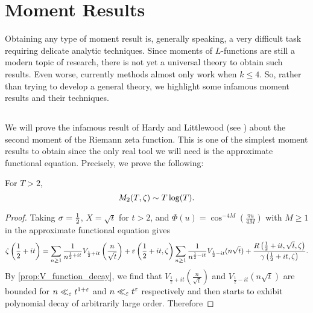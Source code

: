 \chapter{Moment Results}
  Obtaining any type of moment result is, generally speaking, a very difficult task requiring delicate analytic techniques. Since moments of $L$-functions are still a modern topic of research, there is not yet a universal theory to obtain such results. Even worse, currently methods almost only work when $k \le 4$. So, rather than trying to develop a general theory, we highlight some infamous moment results and their techniques.
  \section{}
    We will prove the infamous result of Hardy and Littlewood (see \cite{hardy1916contributions}) about the second moment of the Riemann zeta function. This is one of the simplest moment results to obtain since the only real tool we will need is the approximate functional equation. Precisely, we prove the following:

    \begin{theorem}
      For $T > 2$,
      \[
        M_{2}(T,\zeta) \sim T\log(T).
      \]
    \end{theorem}
    \begin{proof}
      Taking $\sigma = \frac{1}{2}$, $X = \sqrt{t}$ for $t > 2$, and $\Phi(u) = \cos^{-4M}\left(\frac{\pi u}{4M}\right)$ with $M \ge 1$ in the approximate functional equation gives
      \[
        \zeta\left(\frac{1}{2}+it\right) = \sum_{n \ge 1}\frac{1}{n^{\frac{1}{2}+it}}V_{\frac{1}{2}+it}\left(\frac{n}{\sqrt{t}}\right)+\varepsilon\left(\frac{1}{2}+it,\zeta\right)\sum_{n \ge 1}\frac{1}{n^{\frac{1}{2}-it}}V_{\frac{1}{2}-it}(n\sqrt{t})+\frac{R\left(\frac{1}{2}+it,\sqrt{t},\zeta\right)}{\gamma\left(\frac{1}{2}+it,\zeta\right)}.
      \]
      By \cref{prop:V_function_decay}, we find that $V_{\frac{1}{2}+it}\left(\frac{n}{\sqrt{t}}\right)$ and $V_{\frac{1}{2}-it}(n\sqrt{t})$ are bounded for $n \ll_{\varepsilon} t^{1+\varepsilon}$ and $n \ll_{\varepsilon} t^{\varepsilon}$ respectively and then starts to exhibit polynomial decay of arbitrarily large order. Therefore 
    \end{proof}